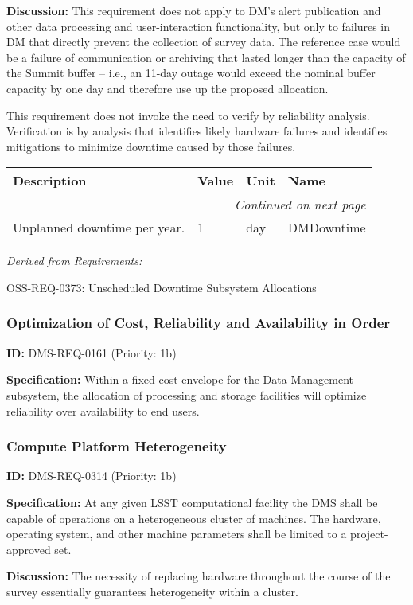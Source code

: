 \documentclass[SE,toc,lsstdraft]{lsstdoc}
\makeatletter
\newcommand{\paramname}[1]{\hspace{0pt}#1}
\newcommand{\unitname}[1]{\hspace{0pt}#1}
\newenvironment{parameters}[0]{%
\setlength\LTleft{0pt}
\setlength\LTright{\fill}
\begin{small}
\begin{longtable}[]{|p{0.49\textwidth}|l|p{0.6in}|p{1.70in}@{}|}

\hline \textbf{Description} & \textbf{Value} & \textbf{Unit} & \textbf{Name} \\ \hline
\endhead

\hline \multicolumn{4}{r}{\emph{Continued on next page}} \\
\endfoot

\hline\hline
\endlastfoot
}{%
\hline
\end{longtable}
\end{small}
}
\makeatother
\begin{document}
\textbf{Discussion:} This requirement does not apply to DM's alert publication and other data processing and user-interaction functionality, but only to failures in DM that directly prevent the collection of survey data. The reference case would be a failure of communication or archiving that lasted longer than the capacity of the Summit buffer -- i.e., an 11-day outage would exceed the nominal buffer capacity by one day and therefore use up the proposed allocation.

This requirement does not invoke the need to verify by reliability analysis. Verification is by analysis that identifies likely hardware failures and identifies mitigations to minimize downtime caused by those failures.

\begin{parameters}
Unplanned downtime per year.
&
1
&
\unitname{%
day
}
&
\paramname{%
DMDowntime
} \\\hline
\end{parameters}

\emph{Derived from Requirements:}

OSS-REQ-0373:
Unscheduled Downtime Subsystem Allocations \newline

\subsubsection{Optimization of Cost, Reliability and Availability in Order}

\label{DMS-REQ-0161}
\textbf{ID:} DMS-REQ-0161 (Priority: 1b)

\textbf{Specification:} Within a fixed cost envelope for the Data Management subsystem, the allocation of processing and storage facilities will optimize reliability over availability to end users.

\subsubsection{Compute Platform Heterogeneity}

\label{DMS-REQ-0314}
\textbf{ID:} DMS-REQ-0314 (Priority: 1b)

\textbf{Specification:} At any given LSST computational facility the DMS shall be capable of operations on a heterogeneous cluster of machines. The hardware, operating system, and other machine parameters shall be limited to a project-approved set.

\textbf{Discussion: }The necessity of replacing hardware throughout the course of the survey essentially guarantees heterogeneity within a cluster.
\end{document}
